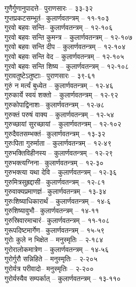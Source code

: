 \begin{raggedright}
\begin{parcolumns}[colwidths={1=.55\textwidth,2=.55\textwidth}]{2}
{गुणैर्गुणानुपादत्ते– 	पुराणसारः   – ३३-३२\\
गुप्तप्रकटसम्भूतं– 	कुलार्णवतन्त्रम्  – ११-१०३\\
गुरवो बहवः सन्ति– 	कुलार्णवतन्त्रम्  – १२-१०६\\
गुरवो बहवः सन्ति कुमन्त्र	 – 	कुलार्णवतन्त्रम्  – १२-१०७\\
गुरवो बहवः सन्ति दीप	– 	कुलार्णवतन्त्रम्  – १२-१०४\\
गुरवो बहवः सन्ति वेद	– 	कुलार्णवतन्त्रम्  – १२-१०५\\
गुरवो बहवः सन्ति शिष्य	– 	कुलार्णवतन्त्रम्  – १२-१०८\\
गुरावतुष्टेऽतुष्टाः– 	पुराणसारः   – ३९-६१\\
गुरुं न मर्त्यं बुध्येत	– 	कुलार्णवतन्त्रम्  – १२-४६\\
गुरुकार्ये स्वयं शक्तो	– 	कुलार्णवतन्त्रम्  – १२-९२\\
गुरुकोपाद्विनाशः– 	कुलार्णवतन्त्रम्  – १२-७८\\
गुरुक्तं परुषं वाक्य	– 	कुलार्णवतन्त्रम्  – १२-५४\\
गुरुच्छायां सुरच्छायां	– 	कुलार्णवतन्त्रम्  – १२-१०२\\
गुरुदैवतसम्भक्तं– 	कुलार्णवतन्त्रम्  – १३-३२\\
गुरुःपिता गुरुर्माता	– 	कुलार्णवतन्त्रम्  – १२-४९\\
गुरुभक्तिविहीनस्य	– 	कुलार्णवतन्त्रम्  – १२-२९\\
गुरुभक्त्यग्निना– 	कुलार्णवतन्त्रम्  – १२-३०\\
गुरुभक्त्या यथा देवि	– 	कुलार्णवतन्त्रम्  – १२-३६\\
गुरुमित्रसुह्रद्दासी– 	कुलार्णवतन्त्रम्  – १२-८१\\
गुरुवाक्यप्रमाणज्ञं– 	कुलार्णवतन्त्रम्  – १३-३४\\
गुरुःशिष्याधिकारार्थं	– 	कुलार्णवतन्त्रम्  – १४-६\\
गुरुशिष्यावुभौ– 	कुलार्णवतन्त्रम्  – १४-११\\
गुरुस्रिवारमाचारं– 	कुलार्णवतन्त्रम्  – ११-१०८\\
गुरूपदिष्टमार्गेण– 	कुलार्णवतन्त्रम्  – १५-५९\\
गुरोः कुले न भिक्षेत	– 	मनुस्मृतिः  – २-१८४\\
गुरोरालोकमात्रेण	– 	कुलार्णवतन्त्रम्  – १४-५६\\
गुरोर्गुरौ सन्निहिते	– 	मनुस्मृतिः  – २-२०५\\
गुरोर्यत्र परीवादो– 	मनुस्मृतिः  – २-२००\\
गुरोर्यस्यैव सम्पर्कात्	– 	कुलार्णवतन्त्रम्  – १३-११०\\
}
\end{parcolumns}
\end{raggedright}
